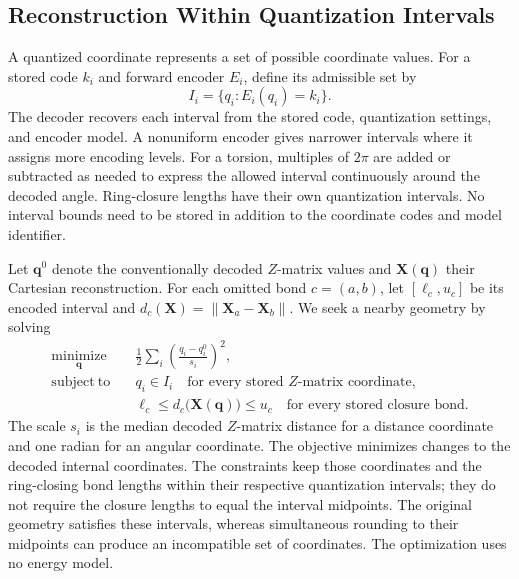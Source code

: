 \documentclass[%
 preprint,
superscriptaddress,
 amsmath,amssymb,
 aip,
 jcp,
]{revtex4-2}
\begin{document}
\subsection{Reconstruction Within Quantization Intervals}

A quantized coordinate represents a set of possible coordinate values.
For a stored code $k_i$ and forward encoder $E_i$, define its admissible set by
\begin{equation}
    I_i=\{q_i:E_i(q_i)=k_i\}.
    \label{eq:constraint_code_cell}
\end{equation}
The decoder recovers each interval from the stored code, quantization settings, and encoder model.
A nonuniform encoder gives narrower intervals where it assigns more encoding levels.
For a torsion, multiples of $2\pi$ are added or subtracted as needed to express the allowed interval continuously around the decoded angle.
Ring-closure lengths have their own quantization intervals.
No interval bounds need to be stored in addition to the coordinate codes and model identifier.

Let $\mathbf q^0$ denote the conventionally decoded $Z$-matrix values and $\mathbf X(\mathbf q)$ their Cartesian reconstruction.
For each omitted bond $c=(a,b)$, let $[\ell_c,u_c]$ be its encoded interval and
$d_c(\mathbf X)=\lVert\mathbf X_a-\mathbf X_b\rVert$.
We seek a nearby geometry by solving
\begin{equation}
\begin{aligned}
    \underset{\mathbf q}{\mathrm{minimize}}\quad&
        \frac{1}{2}\sum_i\left(\frac{q_i-q_i^0}{s_i}\right)^2,\\
    \mathrm{subject\ to}\quad& q_i\in I_i\quad\text{for every stored $Z$-matrix coordinate},\\
        &\ell_c\leq d_c\bigl(\mathbf X(\mathbf q)\bigr)\leq u_c
          \quad\text{for every stored closure bond}.
\end{aligned}
\label{eq:constraint_projection}
\end{equation}
The scale $s_i$ is the median decoded $Z$-matrix distance for a distance coordinate and one radian for an angular coordinate.
The objective minimizes changes to the decoded internal coordinates.
The constraints keep those coordinates and the ring-closing bond lengths within their respective quantization intervals; they do not require the closure lengths to equal the interval midpoints.
The original geometry satisfies these intervals, whereas simultaneous rounding to their midpoints can produce an incompatible set of coordinates.
The optimization uses no energy model.
\end{document}
